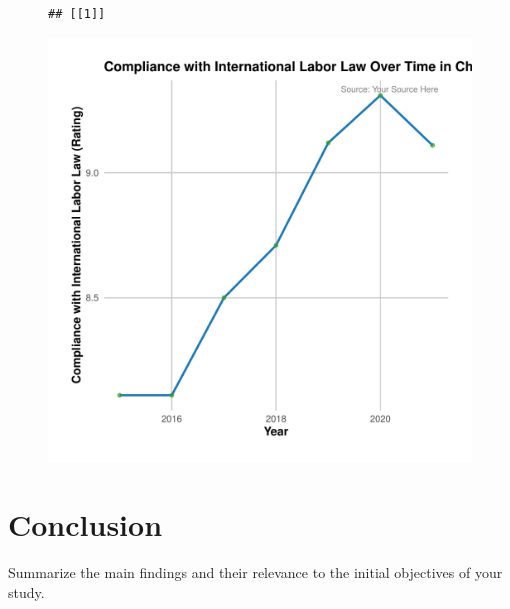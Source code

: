 \documentclass[11pt]{article}\usepackage[]{graphicx}\usepackage[]{xcolor}
\makeatletter
\newenvironment{kframe}{%
 \def\at@end@of@kframe{}%
 \ifinner\ifhmode%
  \def\at@end@of@kframe{\end{minipage}}%
  \begin{minipage}{\columnwidth}%
 \fi\fi%
 \def\FrameCommand##1{\hskip\@totalleftmargin \hskip-\fboxsep
 \colorbox{shadecolor}{##1}\hskip-\fboxsep
     \hskip-\linewidth \hskip-\@totalleftmargin \hskip\columnwidth}%
 \MakeFramed {\advance\hsize-\width
   \@totalleftmargin\z@ \linewidth\hsize
   \@setminipage}}%
 {\par\unskip\endMakeFramed%
 \at@end@of@kframe}
\newenvironment{knitrout}{}{} %
\makeatother
\begin{document}
\begin{figure}[h]
\centering
  \begin{minipage}{0.7\linewidth}
\begin{knitrout}
\color{fgcolor}\begin{kframe}
\begin{verbatim}
## [[1]]
\end{verbatim}
\end{kframe}

{\centering \includegraphics[width=0.7\linewidth]{figure/China_labor_compliance-1} 

}



\end{knitrout}
  \caption{}
  \label{fig:2.3}
  \end{minipage}
\end{figure}


\clearpage
\section{Conclusion}
Summarize the main findings and their relevance to the initial objectives of your study.


\clearpage
\end{document}
